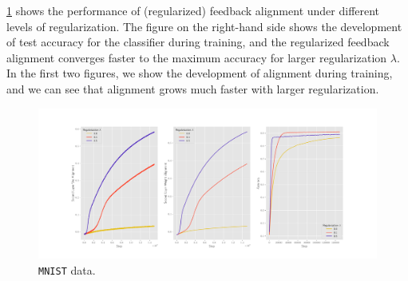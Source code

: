 \cref{fig:mnist} shows the performance of (regularized) feedback alignment under different levels of regularization. The figure on the right-hand side shows the development of test accuracy for the classifier during training, and the regularized feedback alignment converges faster to the maximum accuracy for larger regularization $\lambda$. In the first two figures, we show the development of alignment during training, and we can see that alignment grows much faster with larger regularization.

\begin{figure}[t]
  \centering
  \includegraphics[width=\textwidth]{figures/mnist_2l_v2_horizontal.pdf}
  \caption{\texttt{MNIST} data.}
  \label{fig:mnist}
\end{figure}